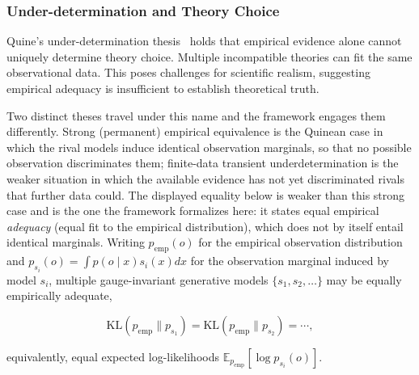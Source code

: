 \documentclass[11pt]{article}
\begin{document}
\subsubsection{Under-determination and Theory Choice}

Quine's under-determination thesis~\cite{Quine1951, Quine1975} holds that empirical evidence alone cannot uniquely determine theory choice.  Multiple incompatible theories can fit the same observational data. This poses challenges for scientific realism, suggesting empirical adequacy is insufficient to establish theoretical truth.

Two distinct theses travel under this name and the framework engages them differently. Strong (permanent) empirical equivalence is the Quinean case in which the rival models induce identical observation marginals, so that no possible observation discriminates them; finite-data transient underdetermination is the weaker situation in which the available evidence has not yet discriminated rivals that further data could. The displayed equality below is weaker than this strong case and is the one the framework formalizes here: it states equal empirical \emph{adequacy} (equal fit to the empirical distribution), which does not by itself entail identical marginals. Writing $p_{\mathrm{emp}}(o)$ for the empirical observation distribution and $p_{s_i}(o) = \int p(o \mid x) s_i(x) dx$ for the observation marginal induced by model $s_i$, multiple gauge-invariant generative models $\{s_1, s_2, \ldots\}$ may be equally empirically adequate,

\begin{equation}
\mathrm{KL}(p_{\mathrm{emp}} \| p_{s_1}) = \mathrm{KL}(p_{\mathrm{emp}} \| p_{s_2}) = \cdots,
\end{equation}

equivalently, equal expected log-likelihoods $\mathbb{E}_{p_{\mathrm{emp}}}[\log p_{s_i}(o)]$.
\end{document}
